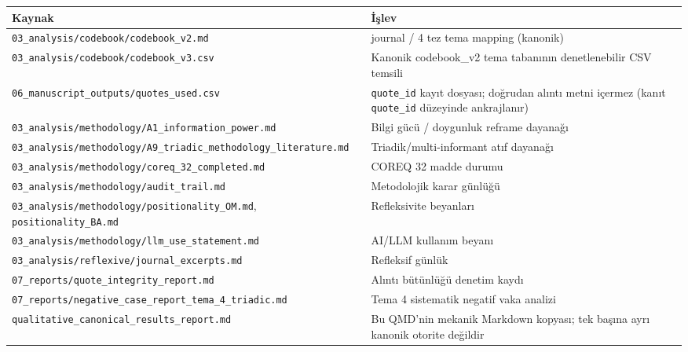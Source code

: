 \documentclass[
  turkish,
  a4paper,
  DIV=11,
  numbers=noendperiod]{scrreprt}
\newcounter{none} %
\begin{document}
{\def\LTcaptype{none} %
\begin{longtable}[]{@{}
  >{\raggedright\arraybackslash}p{}
  >{\raggedright\arraybackslash}p{}@{}}
\toprule\noalign{}
\begin{minipage}[b]{\linewidth}\raggedright
Kaynak
\end{minipage} & \begin{minipage}[b]{\linewidth}\raggedright
İşlev
\end{minipage} \\
\midrule\noalign{}
\endhead
\bottomrule\noalign{}
\endlastfoot
\texttt{03\_analysis/codebook/codebook\_v2.md} & 6 journal / 4 tez tema
mapping (kanonik) \\
\texttt{03\_analysis/codebook/codebook\_v3.csv} & Kanonik codebook\_v2
tema tabanının denetlenebilir CSV temsili \\
\texttt{06\_manuscript\_outputs/quotes\_used.csv} & \texttt{quote\_id}
kayıt dosyası; doğrudan alıntı metni içermez (kanıt \texttt{quote\_id}
düzeyinde ankrajlanır) \\
\texttt{03\_analysis/methodology/A1\_information\_power.md} & Bilgi gücü
/ doygunluk reframe dayanağı \\
\texttt{03\_analysis/methodology/A9\_triadic\_methodology\_literature.md}
& Triadik/multi-informant atıf dayanağı \\
\texttt{03\_analysis/methodology/coreq\_32\_completed.md} & COREQ 32
madde durumu \\
\texttt{03\_analysis/methodology/audit\_trail.md} & Metodolojik karar
günlüğü \\
\texttt{03\_analysis/methodology/positionality\_OM.md},
\texttt{positionality\_BA.md} & Refleksivite beyanları \\
\texttt{03\_analysis/methodology/llm\_use\_statement.md} & AI/LLM
kullanım beyanı \\
\texttt{03\_analysis/reflexive/journal\_excerpts.md} & Refleksif
günlük \\
\texttt{07\_reports/quote\_integrity\_report.md} & Alıntı bütünlüğü
denetim kaydı \\
\texttt{07\_reports/negative\_case\_report\_tema\_4\_triadic.md} & Tema
4 sistematik negatif vaka analizi \\
\texttt{qualitative\_canonical\_results\_report.md} & Bu QMD'nin mekanik
Markdown kopyası; tek başına ayrı kanonik otorite değildir \\
\end{longtable}
}
\end{document}
